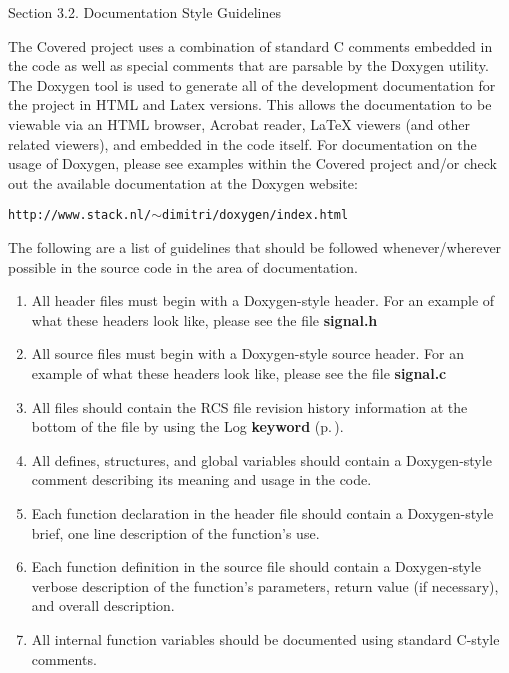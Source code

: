 \begin{Desc}
\item[Section 3.2.  Documentation Style Guidelines]\par
 The Covered project uses a combination of standard C comments embedded in the code as well as special comments that are parsable by the Doxygen utility. The Doxygen tool is used to generate all of the development documentation for the project in HTML and Latex versions. This allows the documentation to be viewable via an HTML browser, Acrobat reader, La\-Te\-X viewers (and other related viewers), and embedded in the code itself. For documentation on the usage of Doxygen, please see examples within the Covered project and/or check out the available documentation at the Doxygen website:

 {\tt http://www.stack.nl/$\sim$dimitri/doxygen/index.html}

 The following are a list of guidelines that should be followed whenever/wherever possible in the source code in the area of documentation.

\begin{enumerate}
\item 
All header files must begin with a Doxygen-style header. For an example of what these  headers look like, please see the file {\bf signal.h}\item 
All source files must begin with a Doxygen-style source header. For an example of what these headers look like, please see the file {\bf signal.c}\item 
All files should contain the RCS file revision history information at the bottom of the file by using the Log {\bf keyword} {\rm (p.\,\pageref{structkeyword})}.\item 
All defines, structures, and global variables should contain a Doxygen-style comment  describing its meaning and usage in the code.\item 
Each function declaration in the header file should contain a Doxygen-style brief, one line description of the function's use.\item 
Each function definition in the source file should contain a Doxygen-style verbose description of the function's parameters, return value (if necessary), and overall description.\item 
All internal function variables should be documented using standard C-style comments.\end{enumerate}
\end{Desc}


